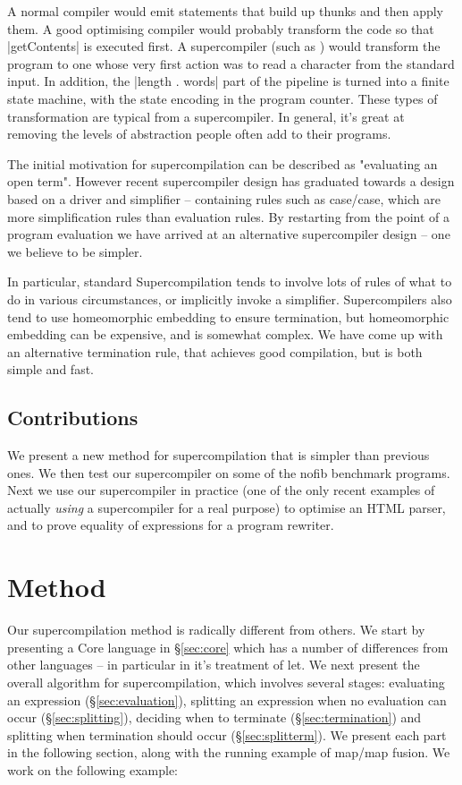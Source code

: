 \documentclass{sigplanconf}
\begin{document}
A normal compiler would emit statements that build up thunks and then apply them. A good optimising compiler would probably transform the code so that |getContents| is executed first. A supercompiler (such as \cite{me:ifl2007}) would transform the program to one whose very first action was to read a character from the standard input. In addition, the |length . words| part of the pipeline is turned into a finite state machine, with the state encoding in the program counter. These types of transformation are typical from a supercompiler. In general, it's great at removing the levels of abstraction people often add to their programs.

The initial motivation for supercompilation can be described as "evaluating an open term". However recent supercompiler design has graduated towards a design based on a driver and simplifier -- containing rules such as case/case, which are more simplification rules than evaluation rules. By restarting from the point of a program evaluation we have arrived at an alternative supercompiler design -- one we believe to be simpler.

In particular, standard Supercompilation tends to involve lots of rules of what to do in various circumstances, or implicitly invoke a simplifier. Supercompilers also tend to use homeomorphic embedding to ensure termination, but homeomorphic embedding can be expensive, and is somewhat complex. We have come up with an alternative termination rule, that achieves good compilation, but is both simple and fast.

\subsection{Contributions}

We present a new method for supercompilation that is simpler than previous ones. We then test our supercompiler on some of the nofib benchmark programs. Next we use our supercompiler in practice (one of the only recent examples of actually \textit{using} a supercompiler for a real purpose) to optimise an HTML parser, and to prove equality of expressions for a program rewriter.

\section{Method}

Our supercompilation method is radically different from others. We start by presenting a Core language in \S\ref{sec:core} which has a number of differences from other languages -- in particular in it's treatment of let. We next present the overall algorithm for supercompilation, which involves several stages: evaluating an expression (\S\ref{sec:evaluation}), splitting an expression when no evaluation can occur (\S\ref{sec:splitting}), deciding when to terminate (\S\ref{sec:termination}) and splitting when termination should occur (\S\ref{sec:splitterm}). We present each part in the following section, along with the running example of map/map fusion. We work on the following example:
\end{document}
